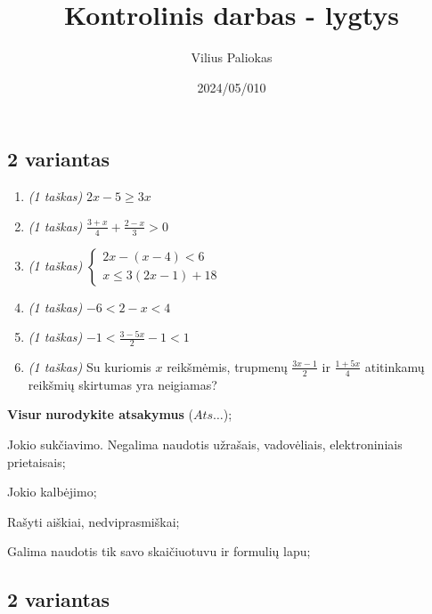 \documentclass[a4paper]{article}
\title{Kontrolinis darbas - lygtys}
\author{Vilius Paliokas}
\date{2024/05/010}
\begin{document}
\thispagestyle{fancy}

\titlespacing*{\subsection}{0pt}{.75ex}{0.75ex}

\subsection*{2 variantas}

\begin{enumerate}
      \item \textit{(1 taškas)} $2x-5 \geqslant 3x$
      \item \textit{(1 taškas)} $\frac{3+x}{4}+\frac{2-x}{3}>0$
      \item \textit{(1 taškas)}
      \(
      \left\{\begin{matrix}
            2x-(x-4) < 6 \\
            x \leqslant 3(2x-1)+18
      \end{matrix}\right.
      \)
      \item \textit{(1 taškas)} $-6<2-x<4 $
      \item \textit{(1 taškas)} $-1<\frac{3-5x}{2}-1 < 1$
      \item \textit{(1 taškas)} Su kuriomis $x$ reikšmėmis, trupmenų $\frac{3x-1}{2}$ ir $\frac{1+5x}{4}$ atitinkamų reikšmių skirtumas yra neigiamas?
\end{enumerate}

\begin{small}
      \begin{enumerate*}[label={(\arabic*)}]
            \item \textbf{Visur} \textbf{nurodykite atsakymus} ($Ats\ldots$);
            \item Jokio sukčiavimo. Negalima naudotis užrašais, vadovėliais,
            elektroniniais prietaisais;
            \item Jokio kalbėjimo;
            \item Rašyti aiškiai, nedviprasmiškai;
            \item Galima naudotis tik savo skaičiuotuvu ir formulių lapu;
      \end{enumerate*}
\end{small}

\vspace*{3mm}

\subsection*{2 variantas}
\end{document}
